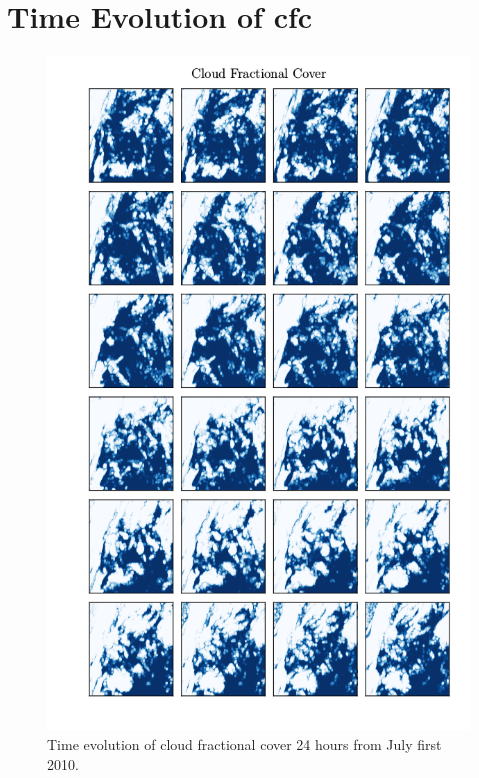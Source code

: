 \chapter{Time Evolution of \acrlong{cfc} } \label{app:timelapse}
\begin{figure}[ht]
    \centering
    \includegraphics[scale=0.70]{python_figs/timelapse_cloud_cover_24hrs_from_2010-07-01.png}
    \caption{Time evolution of cloud fractional cover 24 hours from July first 2010.}
    \label{fig:time_lapse}
\end{figure}

\cleardoublepage
